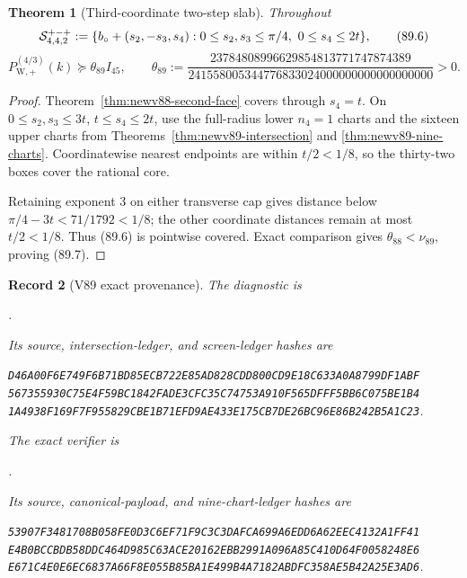 \documentclass[11pt,oneside]{article}
\newtheorem{theorem}{Theorem}[section]
\newtheorem{record}[theorem]{Record}
\theoremstyle{definition}
\theoremstyle{remark}
\begin{document}
\begin{theorem}[Third-coordinate two-step slab]
\label{thm:newv89-two-step-slab}
Throughout
\[
 {\cal S}^{+-+}_{4,4,2}:=
 \{b_\circ+(s_2,-s_3,s_4):
 0\leq s_2,s_3\leq\pi/4,\ 0\leq s_4\leq2t\},          \tag{89.6}
\]
\[
 P_{\mathrm W,+}^{(4/3)}(k)
 \succeq\theta_{89}I_{45},\qquad
 \theta_{89}:=
 \frac{23784808996629854813771747874389}
 {241558005344776833024000000000000000000}>0.         \tag{89.7}
\]
\end{theorem}

\begin{proof}
Theorem~\ref{thm:newv88-second-face} covers through \(s_4=t\).
On \(0\leq s_2,s_3\leq3t\), \(t\leq s_4\leq2t\), use the
full-radius lower \(n_4=1\) charts and the sixteen upper charts from
Theorems~\ref{thm:newv89-intersection} and
\ref{thm:newv89-nine-charts}.  Coordinatewise nearest endpoints
are within \(t/2<1/8\), so the thirty-two boxes cover the rational
core.

Retaining exponent \(3\) on either transverse cap gives distance
below \(\pi/4-3t<71/1792<1/8\); the other coordinate distances
remain at most \(t/2<1/8\).  Thus (89.6) is pointwise covered.
Exact comparison gives \(\theta_{88}<\nu_{89}\), proving (89.7).
\end{proof}

\begin{record}[V89 exact provenance]
\label{rec:newv89-provenance}
The diagnostic is
\begin{center}\footnotesize
{}.
\end{center}
Its source, intersection-ledger, and screen-ledger hashes are
\begin{center}\scriptsize
\texttt{D46A00F6E749F6B71BD85ECB722E85AD828CDD800CD9E18C633A0A8799DF1ABF}\\
\texttt{567355930C75E4F59BC1842FADE3CFC35C74753A910F565DFFF5BB6C075BE1B4}\\
\texttt{1A4938F169F7F955829CBE1B71EFD9AE433E175CB7DE26BC96E86B242B5A1C23}.
\end{center}
The exact verifier is
\begin{center}\footnotesize
{}.
\end{center}
Its source, canonical-payload, and nine-chart-ledger hashes are
\begin{center}\scriptsize
\texttt{53907F3481708B058FE0D3C6EF71F9C3C3DAFCA699A6EDD6A62EEC4132A1FF41}\\
\texttt{E4B0BCCBDB58DDC464D985C63ACE20162EBB2991A096A85C410D64F0058248E6}\\
\texttt{E671C4E0E6EC6837A66F8E055B85BA1E499B4A7182ABDFC358AE5B42A25E3AD6}.
\end{center}
\end{record}
\end{document}
